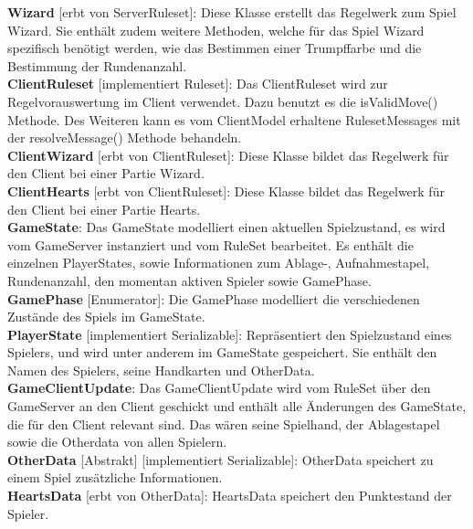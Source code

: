\documentclass{article}
\begin{document}
\textbf{Wizard} [erbt von ServerRuleset]: Diese Klasse erstellt das Regelwerk zum Spiel Wizard. Sie enthält zudem weitere Methoden, welche für das Spiel Wizard spezifisch benötigt werden, wie das Bestimmen einer Trumpffarbe und die Bestimmung der Rundenanzahl. \\
		
\textbf{ClientRuleset} [implementiert Ruleset]:  Das ClientRuleset wird zur Regelvorauswertung im Client verwendet. Dazu benutzt es die isValidMove() Methode. Des Weiteren kann es vom ClientModel erhaltene RulesetMessages mit der resolveMessage() Methode behandeln.  \\

\textbf{ClientWizard} [erbt von ClientRuleset]: Diese Klasse bildet das Regelwerk für den Client bei einer Partie Wizard. \\

\textbf{ClientHearts} [erbt von ClientRuleset]: Diese Klasse bildet das Regelwerk für den Client bei einer Partie Hearts. \\
		
\textbf{GameState}: Das GameState modelliert einen aktuellen Spielzustand, es wird vom GameServer instanziert und vom RuleSet bearbeitet. Es enthält die einzelnen PlayerStates, sowie Informationen zum Ablage-, Aufnahmestapel, Rundenanzahl, den momentan aktiven Spieler sowie GamePhase. \\
		
\textbf{GamePhase} [Enumerator]: Die GamePhase modelliert die verschiedenen Zustände des Spiels im GameState. \\
		
\textbf{PlayerState} [implementiert Serializable]: Repräsentiert den Spielzustand eines Spielers, und wird unter anderem im GameState gespeichert. Sie enthält den Namen des Spielers, seine Handkarten und OtherData. \\
		
\textbf{GameClientUpdate}: Das GameClientUpdate wird vom RuleSet über den GameServer an den Client geschickt und enthält alle Änderungen des GameState, die für den Client relevant sind. Das wären seine Spielhand, der Ablagestapel sowie die Otherdata von allen Spielern. \\
		
\textbf{OtherData} [Abstrakt] [implementiert Serializable]: OtherData speichert zu einem Spiel zusätzliche Informationen. \\
		
\textbf{HeartsData} [erbt von OtherData]: HeartsData speichert den Punktestand der Spieler. \\
		
\end{document}
